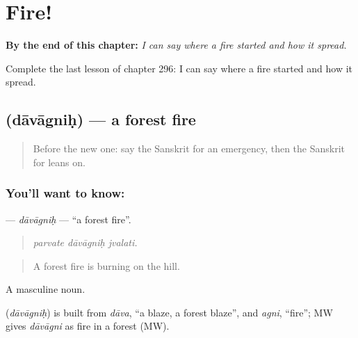 
\chapter{Fire!}
\label{ch:sa-fire}

\begin{chapteropening}
\textbf{By the end of this chapter:} \emph{I can say where a fire started and how it spread.}

Complete the last lesson of chapter 296: I can say where a fire started and how it spread.
\end{chapteropening}

\section[\texorpdfstring{\sk{दावाग्निः} (dāvāgniḥ)}{दावाग्निः (dāvāgniḥ)}]{ (dāvāgniḥ) — a forest fire}

\label{lesson:SA-C296-davagnih}



\begin{quote}
Before the new one: say the Sanskrit for an emergency, then the Sanskrit for leans on.
\end{quote}

\subsection*{You'll want to know: }
\textbf{} — \emph{dāvāgniḥ} — \textquotedblleft{}a forest fire\textquotedblright{}.

\begin{quote}
  
\end{quote}

\begin{quote}
\emph{parvate dāvāgniḥ jvalati.}
\end{quote}

\begin{quote}
A forest fire is burning on the hill.
\end{quote}

A masculine noun.

\begin{cousinweb}
\textbf{} (\emph{dāvāgniḥ}) is built from \emph{dāva}, \textquotedblleft{}a blaze, a forest blaze\textquotedblright{}, and \emph{agni}, \textquotedblleft{}fire\textquotedblright{}; MW gives \emph{dāvāgni} as fire in a forest (MW).
\end{cousinweb}

